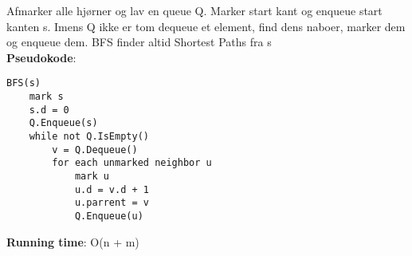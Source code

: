 Afmarker alle hjørner og lav en queue Q. Marker start kant og enqueue start kanten s. Imens Q ikke er tom dequeue et element, find dens naboer, marker dem og enqueue dem. BFS finder altid Shortest Paths fra s\\
\textbf{Pseudokode}:
\begin{lstlisting}[frame=single, mathescape=true]
BFS(s)
	mark s
	s.d = 0
	Q.Enqueue(s)
	while not Q.IsEmpty()
		v = Q.Dequeue()
		for each unmarked neighbor u
			mark u
			u.d = v.d + 1
			u.parrent = v
			Q.Enqueue(u)
\end{lstlisting}
\textbf{Running time}: O(n + m)
